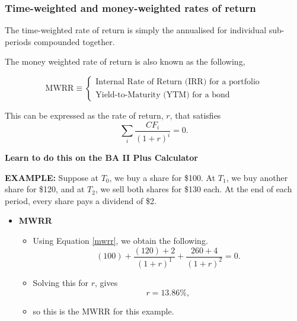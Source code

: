 \documentclass[../notes_compiled.tex]{subfiles}
\begin{document}
\subsubsection{Time-weighted and money-weighted rates of return}
\label{ssec-twrr-mwrrr}
\begin{itemize}
\item The time-weighted rate of return is simply the annualised for individual sub-periods compounded together.

\item The money weighted rate of return is also known as the following,

\begin{equation*}
\text{MWRR} \equiv \begin{cases} \text{Internal Rate of Return (IRR) for a portfolio} \\ \text{Yield-to-Maturity (YTM) for a bond} \end{cases}
\end{equation*}

\item This can be expressed as the rate of return, $r$, that satisfies
\begin{equation}
\sum_{i}\frac{CF_{i}}{(1+r)^{i}} = 0. \label{mwrr}
\end{equation}

\item[] \textbf{Learn to do this on the BA II Plus Calculator}
\textcolor{RedViolet}{
\item[] \textbf{EXAMPLE:} Suppose at $T_{0}$, we buy a share for \$100. At $T_{1}$, we buy another share for \$120, and at $T_{2}$, we sell both shares for \$130 each. At the end of each period, every share pays a dividend of \$2.
}
{\color{RoyalBlue}
\begin{itemize}
\item[] \textbf{MWRR}
\begin{itemize}
\item[] Using Equation \ref{mwrr}, we obtain the following.
\begin{equation*}
 (100) + \frac{(120)+2}{(1+r)^{1}}+\frac{260+4}{(1+r)^{2}} = 0.
\end{equation*}
\item[] Solving this for $r$, gives
\begin{equation*}
r=13.86\%,
\end{equation*}
\item[] so this is the MWRR for this example.
\end{itemize}


\end{itemize}}
\end{itemize}
\end{document}
